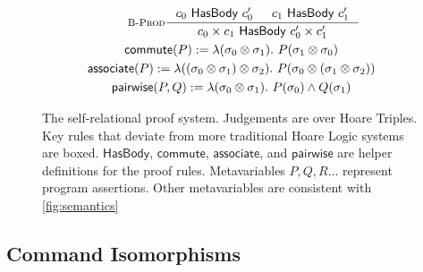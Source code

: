 \documentclass[p.tex]{subfiles}
\begin{document}
\begin{figure}
\begin{spreadlines}{5pt}
\begin{subequations}
\begin{gather*}
  \qquad
  \inference[\textsc{B-Prod}]{%
    \hasbody{c_0}{c_0'}&
    \hasbody{c_1}{c_1'}
  }{%
    \hasbody{\cprod{c_0}{c_1}}{\cprod{c_0'}{c_1'}}
  }
  \\
  \commute(P) := \lambda(\sigma_0 \otimes \sigma_1).~P(\sigma_1 \otimes \sigma_0)\\
  \associate(P) :=%
  \lambda((\sigma_0 \otimes \sigma_1) \otimes \sigma_2).~P(\sigma_0
  \otimes (\sigma_1 \otimes \sigma_2))\\
  \pairwise(P, Q) := \lambda(\sprod{\sigma_0}{\sigma_1}).~P(\sigma_0) \land Q(\sigma_1)
\end{gather*}
\end{subequations}
\end{spreadlines}
\caption{The self-relational proof system. Judgements are over
Hoare Triples. Key rules that deviate from more traditional Hoare
Logic systems are boxed.
$\textsf{HasBody}$, $\textsf{commute}$, $\textsf{associate}$, and
$\textsf{pairwise}$ are helper definitions for the proof rules.
Metavariables $P, Q, R\ldots$ represent program
assertions. Other metavariables are consistent with
\cref{fig:semantics}}\label{fig:proof-system}
\end{figure}

\subsection{Command Isomorphisms}
\end{document}
